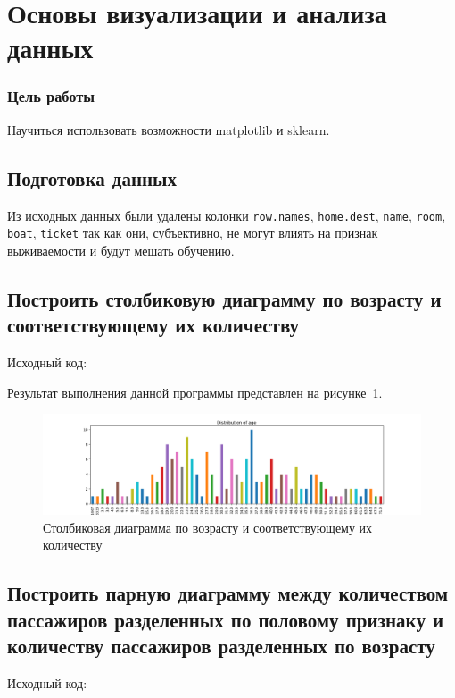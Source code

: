 



\newcommand{\labnumber}{7} %



\graphicspath{{figures/}}


\Russian


\addtocounter{page}{1}

\section*{Основы визуализации и анализа данных}
\subsubsection*{Цель работы}
Научиться использовать возможности matplotlib и sklearn.

\subsection*{Подготовка данных}
Из исходных данных были удалены колонки \texttt{row.names}, \texttt{home.dest}, \texttt{name}, \texttt{room}, \texttt{boat}, \texttt{ticket} так как они, субъективно, не могут влиять на признак выживаемости и будут мешать обучению.

\subsection*{Построить столбиковую диаграмму по возрасту и соответствующему их количеству}
Исходный код:  
 

Результат выполнения данной программы представлен на рисунке~\ref{fig:main_1}.

\begin{figure}[H]
    \centering
        \includegraphics[width=\textwidth]{main_1}
    \caption{Столбиковая диаграмма по возрасту и соответствующему их количеству}
    \label{fig:main_1}
\end{figure}

\subsection*{Построить парную диаграмму между количеством пассажиров разделенных по половому признаку и количеству пассажиров разделенных по возрасту}
Исходный код:  
 

